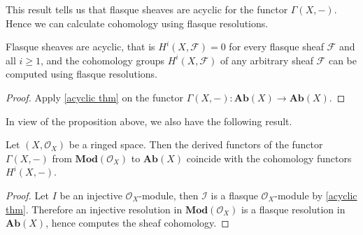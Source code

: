 This result tells us that flasque sheaves are acyclic for the functor $\Gamma(X,-)$. Hence we can calculate cohomology using flasque resolutions. 
\begin{proposition}\label{flasque is acyclic}
Flasque sheaves are acyclic, that is $H^i(X,\mathscr{F})=0$ for every flasque
sheaf $\mathscr{F}$ and all $i\geq1$, and the cohomology groups $H^i(X,\mathscr{F})$ of any arbitrary sheaf $\mathscr{F}$ can be computed using flasque resolutions.
\end{proposition}
\begin{proof}
Apply \cref{acyclic thm} on the functor $\Gamma(X,-):\mathbf{Ab}(X)\to\mathbf{Ab}(X)$.
\end{proof}
In view of the proposition above, we also have the following result.
\begin{proposition}
Let $(X,\mathscr{O}_X)$ be a ringed space. Then the derived functors of the functor $\Gamma(X,-)$ from $\mathbf{Mod}(\mathscr{O}_X)$ to $\mathbf{Ab}(X)$ coincide with the cohomology functors $H^i(X,-)$.
\end{proposition}
\begin{proof}
Let $I$ be an injective $\mathscr{O}_X$-module, then $\mathscr{I}$ is a flasque $\mathscr{O}_X$-module by \cref{acyclic thm}. Therefore an injective resolution in $\mathbf{Mod}(\mathscr{O}_X)$ is a flasque resolution in $\mathbf{Ab}(X)$, hence computes the sheaf cohomology.
\end{proof}
